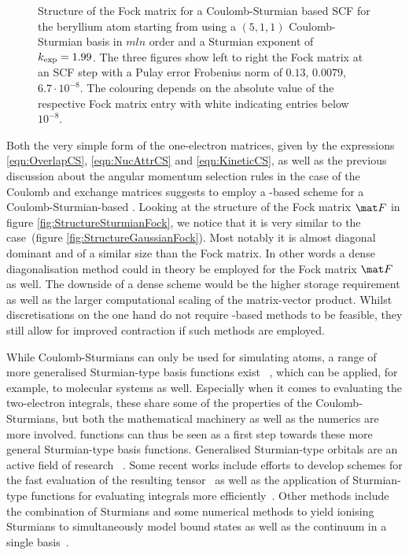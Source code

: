 \begin{figure}
	\centering
	\caption[Structure of the Fock matrix for a Coulomb-Sturmian based SCF]
		{Structure of the Fock matrix for a Coulomb-Sturmian based SCF
		for the beryllium atom starting from using a $(5,1,1)$
		Coulomb-Sturmian basis in $mln$ order
		and a Sturmian exponent of $k_\text{exp} = 1.99$.
		The three figures show left to right the Fock matrix
		at an SCF step with a Pulay error Frobenius norm of
		$0.13$, $0.0079$, $6.7 \cdot 10^{-8}$.
		The colouring depends on the absolute value
		of the respective Fock matrix entry
		with white indicating entries below $10^{-8}$.
		}
	\label{fig:StructureSturmianFock}
\end{figure}
Both the very simple form of the one-electron matrices,
given by the expressions
\eqref{eqn:OverlapCS},
\eqref{eqn:NucAttrCS} and
\eqref{eqn:KineticCS},
as well as the previous discussion about the angular momentum selection
rules in the case of the Coulomb and exchange matrices
suggests to employ a \contraction-based scheme
for a Coulomb-Sturmian-based \SCF.
Looking at the structure of the Fock matrix $\matF$
in figure \vref{fig:StructureSturmianFock},
we notice that it is very similar to the \cGTO case~(figure \vref{fig:StructureGaussianFock}).
Most notably it is almost diagonal dominant and of a similar
size than the \cGTO Fock matrix.
In other words a dense diagonalisation method could in theory be employed
for the Fock matrix $\matF$ as well.
The downside of a dense scheme would be the higher
storage requirement as well as the larger
computational scaling of the matrix-vector product.
Whilst \CS discretisations on the one hand
do not require \contraction-based methods to be feasible,
they still allow for improved contraction if such methods are employed.

While Coulomb-Sturmians can only be used for simulating atoms,
a range of more generalised Sturmian-type basis functions exist%
~\cite{Hoggan2009,Avery2011},
which can be applied, for example, to molecular systems as well.
Especially when it comes to evaluating the two-electron integrals,
these share some of the properties of the Coulomb-Sturmians,
but both the mathematical machinery as well as the numerics are more involved.
\CS functions can thus be seen as a first step towards these
more general Sturmian-type basis functions.
Generalised Sturmian-type orbitals are an active field of research%
~\cite{%
	Gruzdev1990,Avery2003,Avery2006,Hoggan2009,%
	Randazzo2010,Mitnik2011,%
	Avery2011,Avery2011PhD,%
	Avery2013,Avery2015,Randazzo2015,Granados2016,Abdouraman2016,%
	Morales2016,Avery2017,Avery2018%
}.
Some recent works include efforts to develop schemes for the
fast evaluation of the resulting \ERI tensor~\cite{Avery2013,Avery2017,Avery2018}
as well as the application of Sturmian-type functions
for evaluating \STO integrals more efficiently~\cite{Morales2016,Avery2017}.
Other methods include the combination of
Sturmians and some numerical methods to yield ionising Sturmians
to simultaneously model bound states as well as the continuum
in a single basis~\cite{Randazzo2010,Mitnik2011,Randazzo2015,Granados2016,Abdouraman2016}.

